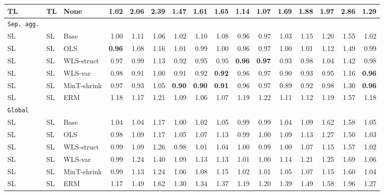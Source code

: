 \documentclass[preprint, 3p, times, twocolumn]{elsarticle}
\begin{document}
\begin{table}
\begin{center}
{\begin{tabular}{l l l rrrrrrrrrrrrr}
      \hspace{0.1cm} 	TL	&TL	&None	&1.02	&2.06	&2.39	&1.47	&1.61	&1.65	&1.14	&1.07	&1.69	&1.88	&1.97	&2.86	&1.29	\\
      \midrule																	
      \texttt{Sep. agg.}																	\\
      \hspace{0.1cm} 	SL	&SL	&Base	&1.00	&1.11	&1.06	&1.02	&1.10	&1.08	&0.96	&0.97	&1.03	&1.15	&1.20	&1.55	&1.02	\\
      \hspace{0.1cm} 	SL	&SL	&OLS	&\textbf{0.96}	&1.08	&1.16	&1.01	&0.99	&1.00	&0.96	&0.97	&1.00	&1.01	&1.12	&1.49	&0.99	\\
      \hspace{0.1cm} 	SL	&SL	&WLS-struct	&0.97	&0.99	&1.13	&0.92	&0.95	&0.95	&\textbf{0.96}	&\textbf{0.97}	&0.93	&0.98	&1.04	&1.42	&0.98	\\
      \hspace{0.1cm} 	SL	&SL	&WLS-var	&0.98	&0.91	&1.00	&0.91	&0.92	&\textbf{0.92}	&0.96	&0.97	&0.90	&0.93	&0.95	&1.16	&\textbf{0.96}	\\
      \hspace{0.1cm} 	SL	&SL	&MinT-shrink	&0.97	&0.93	&1.05	&\textbf{0.90}	&\textbf{0.90}	&\textbf{0.91}	&0.96	&0.97	&0.89	&0.92	&0.98	&1.30	&\textbf{0.96}	\\
      \hspace{0.1cm} 	SL	&SL	&ERM	&1.18	&1.17	&1.21	&1.09	&1.06	&1.07	&1.19	&1.22	&1.11	&1.12	&1.19	&1.57	&1.18	\\
      \midrule																	
      \texttt{Global}																	\\
      \hspace{0.1cm} 	SL	&SL	&Base	&1.04	&1.04	&1.17	&1.00	&1.02	&1.05	&0.99	&0.99	&1.04	&1.09	&1.62	&1.58	&1.05	\\
      \hspace{0.1cm} 	SL	&SL	&OLS	&0.98	&1.09	&1.17	&1.05	&1.07	&1.13	&0.99	&1.00	&1.09	&1.13	&1.27	&1.50	&1.03	\\
      \hspace{0.1cm} 	SL	&SL	&WLS-struct	&0.99	&1.09	&1.26	&0.98	&1.01	&1.04	&1.00	&0.99	&1.00	&1.07	&1.15	&1.57	&1.02	\\
      \hspace{0.1cm} 	SL	&SL	&WLS-var	&0.99	&1.24	&1.40	&1.09	&1.13	&1.13	&1.01	&1.00	&1.14	&1.21	&1.25	&1.69	&1.06	\\
      \hspace{0.1cm} 	SL	&SL	&MinT-shrink	&0.99	&1.13	&1.24	&1.06	&1.08	&1.15	&1.02	&1.01	&1.05	&1.07	&1.15	&1.60	&1.04	\\
      \hspace{0.1cm} 	SL	&SL	&ERM	&1.17	&1.49	&1.62	&1.30	&1.34	&1.37	&1.19	&1.20	&1.39	&1.49	&1.58	&1.96	&1.27	\\
      \bottomrule
      \end{tabular}}
      \end{center}
      \end{table}
          
\end{document}
